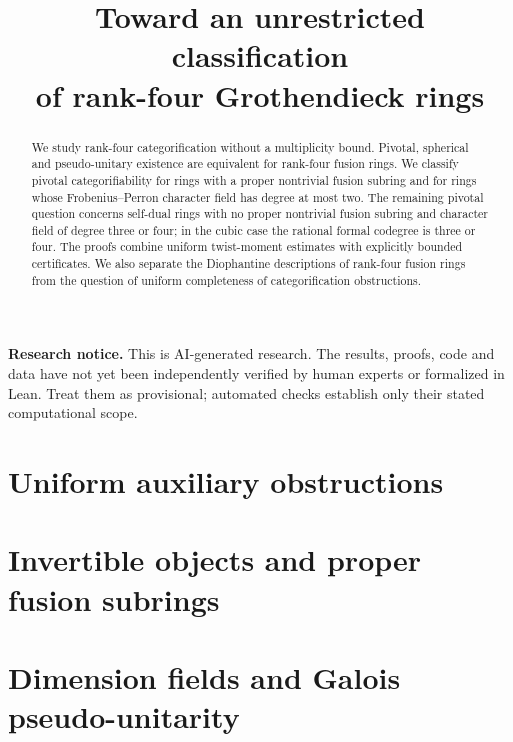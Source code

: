 \documentclass[11pt]{article}
\title{Toward an unrestricted classification\\of rank-four Grothendieck rings}
\date{}
\begin{document}
\maketitle
\begin{abstract}
We study rank-four categorification without a multiplicity bound. Pivotal,
spherical and pseudo-unitary existence are equivalent for rank-four fusion
rings. We classify pivotal categorifiability for rings with a proper
nontrivial fusion subring and for rings whose Frobenius--Perron character
field has degree at most two. The remaining pivotal question concerns
self-dual rings with no proper nontrivial fusion subring and character
field of degree three or four; in the cubic case the rational formal
codegree is three or four. The proofs combine uniform twist-moment
estimates with explicitly bounded certificates. We also separate the
Diophantine descriptions of rank-four fusion rings from the question
of uniform completeness of categorification obstructions.
\end{abstract}
\par\medskip\noindent\textbf{Research notice.}
This is AI-generated research. The results, proofs, code and data have not yet
been independently verified by human experts or formalized in Lean. Treat them
as provisional; automated checks establish only their stated computational scope.
\par\medskip

\tableofcontents

\section{Uniform auxiliary obstructions}\label{sec:companion-auxiliary}






\section{Invertible objects and proper fusion subrings}





\section{Dimension fields and Galois pseudo-unitarity}





\end{document}
